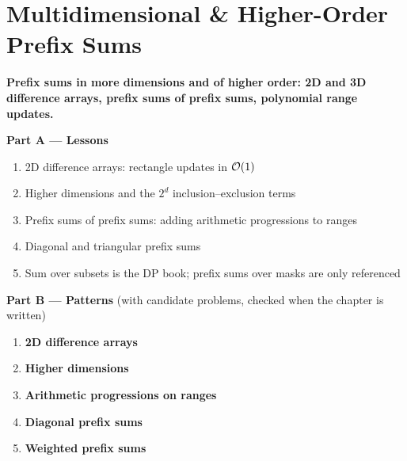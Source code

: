 \chapter{Multidimensional \& Higher-Order Prefix Sums}
\label{ch:multidim_prefix}

\begin{tcolorbox}[enhanced, colback=white, colframe=secondaryblue, boxrule=1pt, arc=2mm]
\textbf{\large\textcolor{primaryblue}{Prefix sums in more dimensions and of higher order: 2D and 3D difference arrays, prefix sums of prefix sums, polynomial range updates.}}
\end{tcolorbox}


\begin{plannedbox}
\textbf{Part A --- Lessons}
\begin{enumerate}[leftmargin=*, label=\textbf{A\arabic*.}, itemsep=1pt]
    \item 2D difference arrays: rectangle updates in $\mathcal{O}(1)$
    \item Higher dimensions and the $2^d$ inclusion--exclusion terms
    \item Prefix sums of prefix sums: adding arithmetic progressions to ranges
    \item Diagonal and triangular prefix sums
    \item Sum over subsets is the DP book; prefix sums over masks are only referenced
\end{enumerate}
\textbf{Part B --- Patterns} (with candidate problems, checked when the chapter is written)
\begin{enumerate}[leftmargin=*, label=\textbf{P\arabic*.}, itemsep=1pt]
    \item \textbf{2D difference arrays}
    \item \textbf{Higher dimensions}
    \item \textbf{Arithmetic progressions on ranges}
    \item \textbf{Diagonal prefix sums}
    \item \textbf{Weighted prefix sums}
\end{enumerate}
\end{plannedbox}
